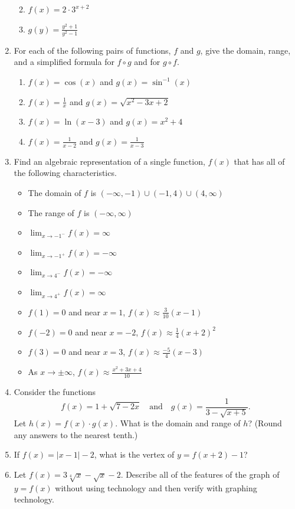 \documentclass[
]{book}
\providecommand{\tightlist}{%
  \setlength{\itemsep}{0pt}\setlength{\parskip}{0pt}}
\theoremstyle{definition}
\theoremstyle{definition}
\theoremstyle{definition}
\theoremstyle{definition}
\theoremstyle{remark}
\begin{document}
\begin{enumerate}
  \begin{enumerate}
  \def\labelenumii{\alph{enumii}.}
  \tightlist
  \item
    \(f(x)=2\cdot 3^{x+2}\)
  \item
    \(g(y)=\frac{y^2+1}{y^2-1}\)
  \end{enumerate}
\item
  For each of the following pairs of functions, \(f\) and \(g\), give the domain, range, and a simplified formula for \(f\circ g\) and for \(g \circ f\).

  \begin{enumerate}
  \def\labelenumii{\alph{enumii}.}
  \tightlist
  \item
    \(f(x)=\cos (x)\) and \(g(x)=\sin^{-1}(x)\)
  \item
    \(f(x)=\frac{1}{x}\) and \(g(x)=\sqrt{x^2-3x+2}\)
  \item
    \(f(x)=\ln(x-3)\) and \(g(x)=x^2+4\)
  \item
    \(f(x)=\frac{1}{x-2}\) and \(g(x)=\frac{1}{x-3}\)
  \end{enumerate}
\item
  Find an algebraic representation of a single function, \(f(x)\) that has all of the following characteristics.

  \begin{itemize}
  \tightlist
  \item
    The domain of \(f\) is \((-\infty, -1) \cup (-1,4) \cup (4,\infty)\)
  \item
    The range of \(f\) is \((-\infty,\infty)\)
  \item
    \(\displaystyle{\lim_{x \rightarrow -1^-} f(x) = \infty}\)
  \item
    \(\displaystyle{\lim_{x \rightarrow -1^+} f(x) = -\infty}\)
  \item
    \(\displaystyle{\lim_{x \rightarrow 4^-} f(x) = -\infty}\)
  \item
    \(\displaystyle{\lim_{x \rightarrow 4^+} f(x) = \infty}\)
  \item
    \(f(1)=0\) and near \(x=1\), \(\displaystyle{f(x)\approx \frac{3}{10}(x-1)}\)
  \item
    \(f(-2)=0\) and near \(x=-2\), \(\displaystyle{f(x) \approx \frac{1}{4}(x+2)^2}\)
  \item
    \(f(3)=0\) and near \(x=3\), \(\displaystyle{f(x) \approx \frac{-5}{4}(x-3)}\)
  \item
    As \(x\rightarrow \pm \infty\), \(\displaystyle{f(x) \approx \frac{x^2+3x+4}{10}}\)
  \end{itemize}
\item
  Consider the functions \[f(x)=1+\sqrt{7-2x} \quad \mbox{and} \quad g(x)=\frac{1}{3-\sqrt{x+5}}.\]
  Let \(h(x)=f(x) \cdot g(x)\). What is the domain and range of \(h\)? (Round any answers to the nearest tenth.)
\item
  If \(f(x)=|x-1|-2\), what is the vertex of \(y=f(x+2)-1\)?
\item
  Let \(f(x)=3\sqrt[4]{x} - \sqrt{x} -2\). Describe all of the features of the graph of \(y=f(x)\) without using technology and then verify with graphing technology.
\end{enumerate}
\end{document}
